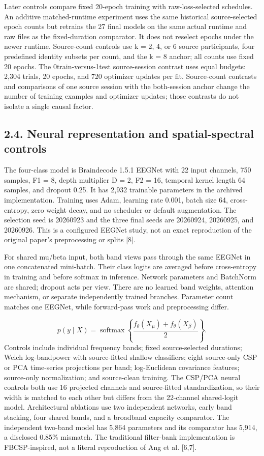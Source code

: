 \documentclass[11pt]{article}
\begin{document}
Later controls compare fixed 20-epoch training with raw-loss-selected schedules. An additive matched-runtime experiment uses the same historical source-selected epoch counts but retrains the 27 final models on the same actual runtime and raw files as the fixed-duration comparator. It does not reselect epochs under the newer runtime. Source-count controls use k = 2, 4, or 6 source participants, four predefined identity subsets per count, and the k = 8 anchor; all counts use fixed 20 epochs. The 0train-versus-1test source-session contrast uses equal budgets: 2,304 trials, 20 epochs, and 720 optimizer updates per fit. Source-count contrasts and comparisons of one source session with the both-session anchor change the number of training examples and optimizer updates; those contrasts do not isolate a single causal factor.

\subsection*{2.4. Neural representation and spatial-spectral controls}
The four-class model is Braindecode 1.5.1 EEGNet with 22 input channels, 750 samples, F1 = 8, depth multiplier D = 2, F2 = 16, temporal kernel length 64 samples, and dropout 0.25. It has 2,932 trainable parameters in the archived implementation. Training uses Adam, learning rate 0.001, batch size 64, cross-entropy, zero weight decay, and no scheduler or default augmentation. The selection seed is 20260923 and the three final seeds are 20260924, 20260925, and 20260926. This is a configured EEGNet study, not an exact reproduction of the original paper's preprocessing or splits [8].

For shared mu/beta input, both band views pass through the same EEGNet in one concatenated mini-batch. Their class logits are averaged before cross-entropy in training and before softmax in inference. Network parameters and BatchNorm are shared; dropout acts per view. There are no learned band weights, attention mechanism, or separate independently trained branches. Parameter count matches one EEGNet, while forward-pass work and preprocessing differ.

\begin{equation*}
p(y\mid X)=\operatorname{softmax}\left\{\frac{f_{\theta}(X_{\mu})+f_{\theta}(X_{\beta})}{2}\right\}.
\end{equation*}
Controls include individual frequency bands; fixed source-selected durations; Welch log-bandpower with source-fitted shallow classifiers; eight source-only CSP or PCA time-series projections per band; log-Euclidean covariance features; source-only normalization; and source-clean training. The CSP/PCA neural controls both use 16 projected channels and source-fitted standardization, so their width is matched to each other but differs from the 22-channel shared-logit model. Architectural ablations use two independent networks, early band stacking, four shared bands, and a broadband capacity comparator. The independent two-band model has 5,864 parameters and its comparator has 5,914, a disclosed 0.85\% mismatch. The traditional filter-bank implementation is FBCSP-inspired, not a literal reproduction of Ang et al. [6,7].
\end{document}
